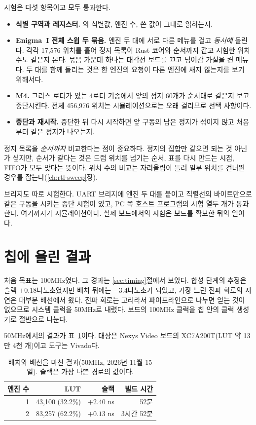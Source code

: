 시험은 다섯 항목이고 모두 통과한다.

\begin{itemize}
\item \textbf{식별 구역과 레지스터.} 의 식별값, 엔진 수, 쓴 값이 그대로 읽히는지.
\item \textbf{Enigma~I 전체 스윕 두 묶음.} 엔진 두 대에 서로 다른 메뉴를 걸고 \emph{동시에} 돌린다.
각각 17,576 위치를 훑어 정지 목록이 Rust 코어와 순서까지 같고 시험한 위치 수도 같은지 본다. 묶음 가운데
하나는 대각선 보드를 끄고 넘어감 가설을 켠 메뉴다. 두 대를 함께 돌리는 것은 한 엔진의 요청이 다른 엔진에
새지 않는지를 보기 위해서다.
\item \textbf{M4.} 그리스 로터가 있는 4로터 기종에서 앞의 정지 60개가 순서대로 같은지 보고 중단시킨다.
전체 456,976 위치는 시뮬레이션으로는 오래 걸리므로 선택 사항이다.
\item \textbf{중단과 재시작.} 중단한 뒤 다시 시작하면 앞 구동의 남은 정지가 섞이지 않고 처음부터 같은
정지가 나오는지.
\end{itemize}

정지 목록을 \emph{순서까지} 비교한다는 점이 중요하다. 정지의 집합만 같으면 되는 것 아닌가 싶지만, 순서가
같다는 것은 드럼 위치를 넘기는 순서, 표를 다시 만드는 시점, FIFO가 모두 맞다는 뜻이다. 위치 수의 비교는
자리올림이 틀려 일부 위치를 건너뛴 경우를 잡는다(\ref{ch:rtl-sweep}장).

브리지도 따로 시험한다. UART 브리지에 엔진 두 대를 붙이고 직렬선의 바이트만으로 같은 구동을 시키는 종단
시험이 있고, PC 쪽 호스트 프로그램의 시험 열두 개가 통과한다. 여기까지가 시뮬레이션이다. 실제 보드에서의
시험은 보드를 확보한 뒤의 일이다.

\section{칩에 올린 결과}\label{sec:e-results}

처음 목표는 100MHz였다. 그 경과는 \ref{sec:timing}절에서 보았다. 합성 단계의 추정은 슬랙 $+0.18$나노초였지만
배치 뒤에는 $-3.4$나노초가 되었고, 가장 느린 전파 회로의 지연은 대부분 배선에서 왔다. 전파 회로는 고리라서
파이프라인으로 나누면 얻는 것이 없으므로 시스템 클럭을 50MHz로 내렸다. 보드의 100MHz 클럭을 칩 안의 클럭
생성기로 절반으로 나눈다.

50MHz에서의 결과가 표~\ref{tab:g-e-impl}이다. 대상은 Nexys Video 보드의 XC7A200T(LUT 약 13만 4천 개)이고
도구는 Vivado다.

\begin{table}[ht]
\centering
\caption{배치와 배선을 마친 결과(50MHz, 2026년 11월 15일). 슬랙은 가장 나쁜 경로의 값이다.}
\label{tab:g-e-impl}
\small
\begin{tabular}{rrrr}
\toprule
엔진 수 & LUT & 슬랙 & 빌드 시간 \\
\midrule
1 & 43,100 (32.2\%) & $+2.40$ ns & 52분 \\
2 & 83,257 (62.2\%) & $+0.13$ ns & 3시간 52분 \\
\bottomrule
\end{tabular}
\end{table}

